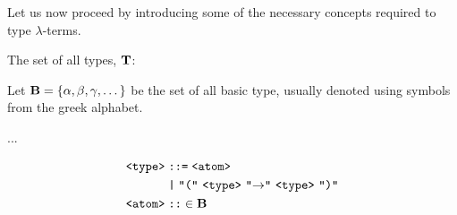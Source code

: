 Let us now proceed by introducing some of the necessary concepts required to type \(\lambda\)-terms.

\begin{definition} The set of all types, $\mathbf{T}$:
  
  Let $\mathbf{B} = \{ \alpha, \beta, \gamma, \dots \}$ be the set of all basic type, usually denoted using symbols from the greek alphabet.
  
  ...
  
  \begin{align*}
    \texttt{<type>} &\;\texttt{::=}\; \texttt{<atom>} \\
                    &\;\texttt{|}\; \texttt{"("}\ \texttt{<type>}\ \texttt{"$\to$"}\ \texttt{<type>}\ \texttt{")"} \\
    \texttt{<atom>} &\;\texttt{::}\in \Tb
  \end{align*}
\end{definition}
















